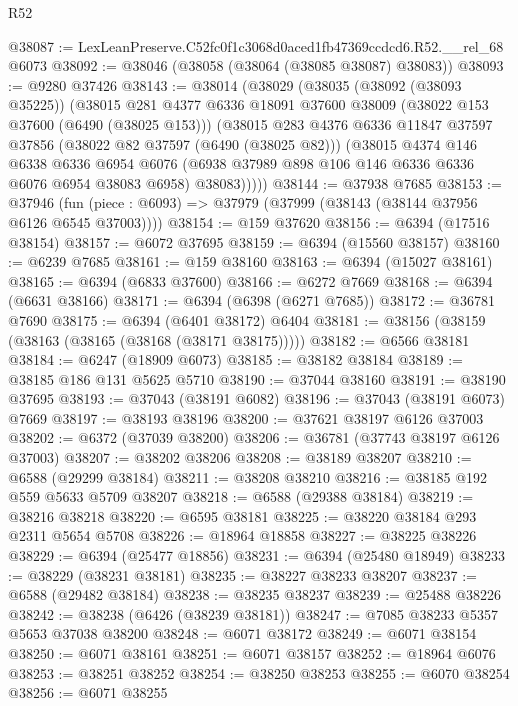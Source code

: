 \begin{lexlean}{R52}
\begin{coremodule}
@38087 := LexLeanPreserve.C52fc0f1c3068d0aced1fb47369ccdcd6.R52.__rel_68 @6073
@38092 := @38046 (@38058 (@38064 (@38085 @38087) @38083))
@38093 := @9280 @37426
@38143 := @38014
    (@38029
      (@38035
        (@38092 (@38093 @35225))
        (@38015
          @281
          @4377
          @6336
          @18091
          @37600
          @38009
          (@38022 @153 @37600 (@6490 (@38025 @153)))
          (@38015
            @283
            @4376
            @6336
            @11847
            @37597
            @37856
            (@38022 @82 @37597 (@6490 (@38025 @82)))
            (@38015
              @4374
              @146
              @6338
              @6336
              @6954
              @6076
              (@6938 @37989 @898 @106 @146 @6336 @6336 @6076 @6954 @38083 @6958)
              @38083)))))
@38144 := @37938 @7685
@38153 := @37946
    (fun (piece : @6093) => @37979 (@37999 (@38143 (@38144 @37956 @6126 @6545 @37003))))
@38154 := @159 @37620
@38156 := @6394 (@17516 @38154)
@38157 := @6072 @37695
@38159 := @6394 (@15560 @38157)
@38160 := @6239 @7685
@38161 := @159 @38160
@38163 := @6394 (@15027 @38161)
@38165 := @6394 (@6833 @37600)
@38166 := @6272 @7669
@38168 := @6394 (@6631 @38166)
@38171 := @6394 (@6398 (@6271 @7685))
@38172 := @36781 @7690
@38175 := @6394 (@6401 @38172) @6404
@38181 := @38156 (@38159 (@38163 (@38165 (@38168 (@38171 @38175)))))
@38182 := @6566 @38181
@38184 := @6247 (@18909 @6073)
@38185 := @38182 @38184
@38189 := @38185 @186 @131 @5625 @5710
@38190 := @37044 @38160
@38191 := @38190 @37695
@38193 := @37043 (@38191 @6082)
@38196 := @37043 (@38191 @6073) @7669
@38197 := @38193 @38196
@38200 := @37621 @38197 @6126 @37003
@38202 := @6372 (@37039 @38200)
@38206 := @36781 (@37743 @38197 @6126 @37003)
@38207 := @38202 @38206
@38208 := @38189 @38207
@38210 := @6588 (@29299 @38184)
@38211 := @38208 @38210
@38216 := @38185 @192 @559 @5633 @5709 @38207
@38218 := @6588 (@29388 @38184)
@38219 := @38216 @38218
@38220 := @6595 @38181
@38225 := @38220 @38184 @293 @2311 @5654 @5708
@38226 := @18964 @18858
@38227 := @38225 @38226
@38229 := @6394 (@25477 @18856)
@38231 := @6394 (@25480 @18949)
@38233 := @38229 (@38231 @38181)
@38235 := @38227 @38233 @38207
@38237 := @6588 (@29482 @38184)
@38238 := @38235 @38237
@38239 := @25488 @38226
@38242 := @38238 (@6426 (@38239 @38181))
@38247 := @7085 @38233 @5357 @5653 @37038 @38200
@38248 := @6071 @38172
@38249 := @6071 @38154
@38250 := @6071 @38161
@38251 := @6071 @38157
@38252 := @18964 @6076
@38253 := @38251 @38252
@38254 := @38250 @38253
@38255 := @6070 @38254
@38256 := @6071 @38255

\end{coremodule}
\end{lexlean}
